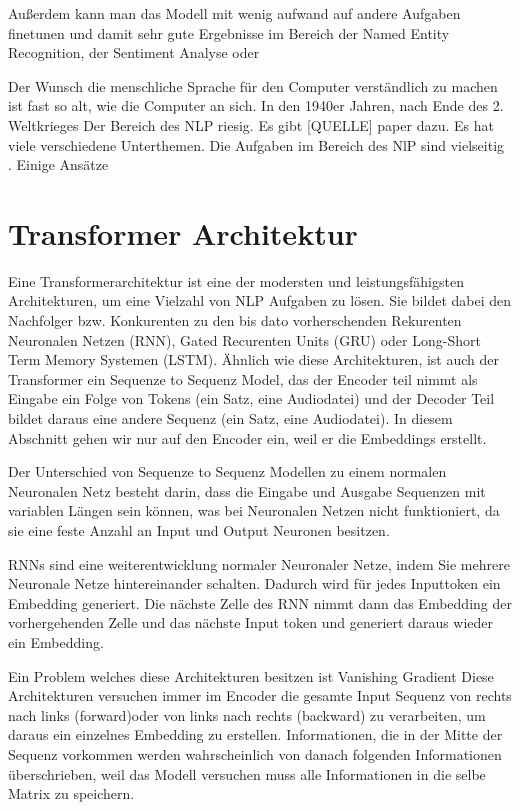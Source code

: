 Außerdem kann man das Modell mit wenig aufwand auf andere Aufgaben finetunen und damit sehr gute Ergebnisse im Bereich der Named Entity Recognition, der Sentiment Analyse oder  










Der Wunsch die menschliche Sprache für den Computer verständlich zu machen ist fast so alt, wie die Computer an sich. 
In den 1940er Jahren, nach Ende des 2. Weltkrieges 
Der Bereich des NLP riesig. 
Es gibt [QUELLE] paper dazu. 
Es hat viele verschiedene Unterthemen. 
Die Aufgaben im Bereich des NlP sind vielseitig . Einige Ansätze 






\section{Transformer Architektur}


Eine Transformerarchitektur ist eine der modersten und leistungsfähigsten Architekturen, um eine Vielzahl von  NLP Aufgaben zu lösen. 
Sie bildet dabei den Nachfolger bzw. Konkurenten zu den bis dato vorherschenden Rekurenten Neuronalen Netzen (RNN), Gated Recurenten Units (GRU) oder Long-Short Term Memory Systemen (LSTM). 
Ähnlich wie diese Architekturen, ist auch der Transformer ein Sequenze to Sequenz Model, das der Encoder teil nimmt als Eingabe ein Folge von Tokens (ein Satz, eine Audiodatei) und der Decoder Teil bildet daraus eine andere Sequenz (ein Satz, eine Audiodatei). 
In diesem Abschnitt gehen wir nur auf den Encoder ein, weil er die Embeddings erstellt.

Der Unterschied von Sequenze to Sequenz Modellen zu einem normalen Neuronalen Netz besteht darin, dass die Eingabe und Ausgabe Sequenzen mit variablen Längen sein können, was bei Neuronalen Netzen nicht funktioniert, da sie eine feste Anzahl an Input und Output Neuronen besitzen.

RNNs sind eine weiterentwicklung normaler Neuronaler Netze, indem Sie mehrere Neuronale Netze hintereinander schalten. 
Dadurch wird für jedes Inputtoken ein Embedding generiert. 
Die nächste Zelle des RNN nimmt dann das Embedding der vorhergehenden Zelle und das nächste Input token und generiert daraus wieder ein Embedding.

Ein Problem welches diese Architekturen besitzen ist Vanishing Gradient
Diese Architekturen versuchen immer im Encoder die gesamte Input Sequenz von rechts nach links (forward)oder von links nach rechts (backward) zu verarbeiten, um daraus ein einzelnes Embedding zu erstellen.
Informationen, die in der Mitte der Sequenz vorkommen werden wahrscheinlich von danach folgenden Informationen überschrieben, weil das Modell versuchen muss alle Informationen in die selbe Matrix zu speichern. 

